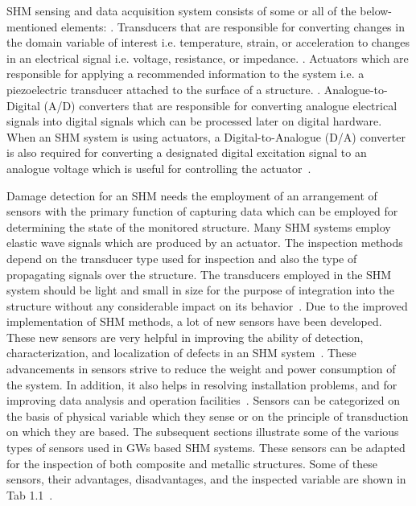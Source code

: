 \documentclass[b5paper, 11pt, titlepage]{book}
\begin{document}
SHM sensing and data acquisition system consists of some or all of the below-mentioned elements:
. Transducers that are responsible for converting changes in the domain variable of interest i.e. temperature, strain, or acceleration to changes in an electrical signal i.e. voltage, resistance, or impedance.
. Actuators which are responsible for applying a recommended information to the system i.e. a piezoelectric transducer attached to the surface of a structure.
. Analogue-to-Digital (A/D) converters that are responsible for converting analogue electrical signals into digital signals which can be processed later on digital hardware. When an SHM system is using actuators, a Digital-to-Analogue (D/A) converter is also required for converting a designated digital excitation signal to an analogue voltage which is useful for controlling the actuator~\cite{TibaduizaBurgos2020, Farrar2012}. 

Damage detection for an SHM needs the employment of an arrangement of sensors with the primary function of capturing data which can be employed for determining the state of the monitored structure. Many SHM systems employ elastic wave signals which are produced by an actuator. The inspection methods depend on the transducer type used for inspection and also the type of propagating signals over the structure. The transducers employed in the SHM system should be light and small in size for the purpose of integration into the structure without any considerable impact on its behavior~\cite{stepinski2013advanced}. Due to the improved implementation of SHM methods, a lot of new sensors have been developed. These new sensors are very helpful in improving the ability of detection, characterization, and localization of defects in an SHM system~\cite{Das2018}. These advancements in sensors strive to reduce the weight and power consumption of the system. In addition, it also helps in resolving installation problems, and for improving data analysis and operation facilities~\cite{TibaduizaBurgos2020}. Sensors can be categorized on the basis of physical variable which they sense or on the principle of transduction on which they are based. The subsequent sections illustrate some of the various types of sensors used in GWs based SHM systems. These sensors can be adapted for the inspection of both composite and metallic structures. Some of these sensors, their advantages, disadvantages, and the inspected variable are shown in Tab 1.1~\cite{Farrar2012,TibaduizaBurgos2020}.
\end{document}
